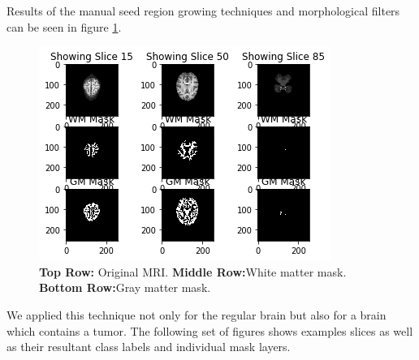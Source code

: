 Results of the manual seed region growing techniques and morphological filters can be seen in figure \ref{fig:resultsSegmentation}.

\begin{figure}[h]
  \centering
  \includegraphics[width=\linewidth]{pictures/resultsSegmentation.png}
  \caption{\textbf{Top Row:} Original MRI. \textbf{Middle Row:}White matter mask. \textbf{Bottom Row:}Gray matter mask.}
  \label{fig:resultsSegmentation}
\end{figure}

We applied this technique not only for the regular brain but also for a brain which contains a tumor.  The following set of figures shows examples slices as well as their resultant class labels and individual mask layers.\\

